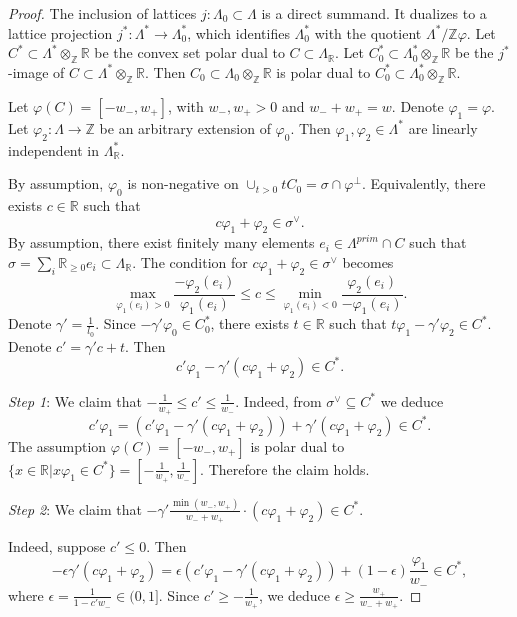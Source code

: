 \documentclass[12pt,twoside]{amsart}
\newcommand{\Z}{{\mathbb Z}}
\newcommand{\R}{{\mathbb R}}
\theoremstyle{plain}
\theoremstyle{definition}
\theoremstyle{remark}
\begin{document}
\begin{proof} The inclusion of lattices $j\colon \Lambda_0\subset \Lambda$ is a direct
	summand. It dualizes to a lattice projection $j^*\colon \Lambda^*\to \Lambda_0^*$,
	which identifies $\Lambda_0^*$ with the quotient $\Lambda^*/\Z \varphi$. 
	Let $C^*\subset \Lambda^*\otimes_\Z \R$ be the convex set polar dual to $C\subset \Lambda_\R$. 
	Let $C^*_0\subset \Lambda_0^*\otimes_\Z \R$ be the $j^*$-image of 
	$C\subset \Lambda^*\otimes_\Z \R$. Then $C_0\subset \Lambda_0\otimes_\Z \R$ is polar 
	dual to $C_0^*\subset \Lambda^*_0\otimes_\Z \R$. 
	
	Let $\varphi(C)=[-w_-,w_+]$, with $w_-,w_+>0$ and $w_-+w_+=w$.
	Denote $\varphi_1=\varphi$. Let $\varphi_2\colon \Lambda\to \Z$ be an arbitrary extension of 
	$\varphi_0$. Then $\varphi_1,\varphi_2\in \Lambda^*$ are linearly independent in $\Lambda^*_\R$.
	
	 By assumption, $\varphi_0$ is non-negative 
    on $\cup_{t>0}tC_0=\sigma\cap \varphi^\perp$. Equivalently, there exists $c\in \R$ such that 
	$$
	c\varphi_1+\varphi_2\in \sigma^\vee.
	$$
	By assumption, there exist finitely many elements $e_i \in \Lambda^{prim}\cap C$ such that
	$\sigma=\sum_i\R_{\ge 0}e_i\subset \Lambda_\R$. The condition for $c\varphi_1+\varphi_2\in \sigma^\vee$ 
	becomes
	$$
	\max_{\varphi_1(e_i)>0}\frac{-\varphi_2(e_i)}{\varphi_1(e_i)}\le c\le
	\min_{\varphi_1(e_i)<0}\frac{\varphi_2(e_i)}{-\varphi_1(e_i)}.
	$$
	Denote $\gamma'=\frac{1}{l_0}$. 
	Since $-\gamma'\varphi_0 \in C^*_0$, there exists $t\in \R$ such that 
	$t\varphi_1-\gamma'\varphi_2\in C^*$. Denote $c'=\gamma'c+t$. Then 
	$$
	c'\varphi_1-\gamma'(c\varphi_1+\varphi_2)\in C^*.
	$$
	
	{\em Step 1}: We claim that $-\frac{1}{w_+}\le c'\le \frac{1}{w_-}$. Indeed, from $\sigma^\vee\subseteq C^*$
	we deduce
	 $$
	c'\varphi_1=
	(c'\varphi_1-\gamma'(c\varphi_1+\varphi_2))+\gamma'(c\varphi_1+\varphi_2)
	\in C^*.
	$$
	The assumption $\varphi(C)=[-w_-,w_+]$ is polar dual to 
	$\{x\in \R | x \varphi_1\in C^* \}=[-\frac{1}{w_+},\frac{1}{w_-}]$. Therefore the claim holds.
	
	{\em Step 2}: We claim that $-\gamma'\frac{\min(w_-,w_+)}{w_-+w_+}\cdot (c\varphi_1+\varphi_2)\in C^*$.
	
	Indeed, suppose $c'\le 0$. Then 
	$$
	-\epsilon\gamma'(c\varphi_1+\varphi_2)=\epsilon(c'\varphi_1-\gamma'(c\varphi_1+\varphi_2))+(1-\epsilon)\frac{\varphi_1}{w_-}\in C^*,
	$$
	where $\epsilon=\frac{1}{1-c'w_-}\in (0,1]$. Since $c'\ge -\frac{1}{w_+}$, we deduce $\epsilon\ge  \frac{w_+}{w_-+w_+}$.
	

\end{proof}
\end{document}
